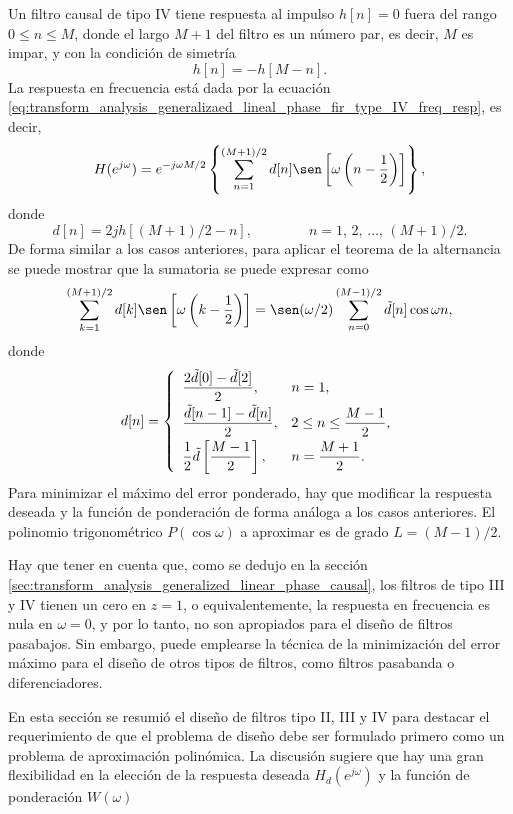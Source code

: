 \documentclass[a4paper]{report}
\begin{document}
Un filtro causal de tipo IV tiene respuesta al impulso \(h[n]=0\) fuera del rango \(0\leq n\leq M\), donde el largo \(M+1\) del filtro es un número par, es decir, \(M\) es impar, y con la condición de simetría
\[
 h[n]=-h[M-n].
\]
La respuesta en frecuencia está dada por la ecuación \ref{eq:transform_analysis_generalizaed_lineal_phase_fir_type_IV_freq_resp}, es decir,
\[
 H(e^{j\omega})=e^{-j\omega M/2}\left\{\sum_{n=1}^{(M+1)/2}d[n]\sen\left[\omega\left(n-\frac{1}{2}\right)\right]\right\}, 
\]
donde
\[
 d[n]=2jh[(M+1)/2-n],
 \qquad\qquad 
 n=1,\,2,\,\dots,\,(M+1)/2.
\]
De forma similar a los casos anteriores, para aplicar el teorema de la alternancia se puede mostrar que la sumatoria se puede expresar como
\begin{equation}
 \sum_{k=1}^{(M+1)/2}d[k]\sen\left[\omega\left(k-\frac{1}{2}\right)\right]=\sen(\omega/2)\sum_{n=0}^{(M-1)/2}\tilde{d}[n]\cos\omega n, 
\end{equation}
donde
\[
 d[n]=\left\{ 
 \begin{array}{ll}
  \dfrac{2\tilde{d}[0]-\tilde{d}[2]}{2},& n=1,\\[\medskipamount]
  \dfrac{\tilde{d}[n-1]-\tilde{d}[n]}{2},& 2\leq n\leq\dfrac{M-1}{2},\\[\medskipamount]
  \dfrac{1}{2}\tilde{d}\left[\dfrac{M-1}{2}\right], & n=\dfrac{M+1}{2}.
 \end{array}
 \right.
\]
Para minimizar el máximo del error ponderado, hay que modificar la respuesta deseada y la función de ponderación de forma análoga a los casos anteriores. El polinomio trigonométrico \(P(\cos\omega)\) a aproximar es de grado \(L=(M-1)/2\).

Hay que tener en cuenta que, como se dedujo en la sección \ref{sec:transform_analysis_generalized_linear_phase_causal}, los filtros de tipo III y IV tienen un cero en \(z=1\), o equivalentemente, la respuesta en frecuencia es nula en \(\omega=0\), y por lo tanto, no son apropiados para el diseño de filtros pasabajos. Sin embargo, puede emplearse la técnica de la minimización del error máximo para el diseño de otros tipos de filtros, como filtros pasabanda o diferenciadores.

En esta sección se resumió el diseño de filtros tipo II, III y IV para destacar el requerimiento de que el problema de diseño debe ser formulado primero como un problema de aproximación polinómica. La discusión sugiere que hay una gran flexibilidad en la elección de la respuesta deseada \(H_d(e^{j\omega})\) y la función de ponderación \(W(\omega)\)
\end{document}
